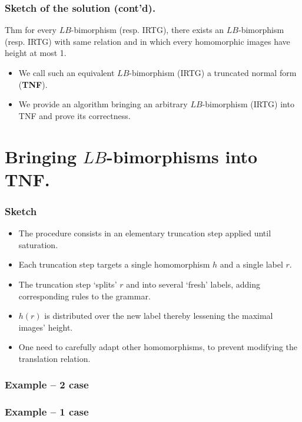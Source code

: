 \documentclass{beamer}
\begin{document}
\begin{frame}
  \frametitle{Sketch of the solution (cont'd).}
  
  \begin{block}{Thm}
    for every $LB$-bimorphism (resp. IRTG), there exists an $LB$-bimorphism (resp. IRTG) with same relation and in which every homomorphic images have height at most 1. 
  \end{block}

  \begin{itemize}
  \item We call such an equivalent $LB$-bimorphism (IRTG) a truncated normal form (\textbf{TNF}).
  \item We provide an algorithm bringing an arbitrary $LB$-bimorphism (IRTG) into TNF and prove its correctness.
  \end{itemize}
 
  
\end{frame}

\section{Bringing $LB$-bimorphisms into TNF.}

\begin{frame}
  \frametitle{Sketch}

  \begin{itemize}
  \item The procedure consists in an elementary truncation step applied until saturation.
  \item Each truncation step targets a single homomorphism $h$ and a single label $r$.
  \item The truncation step `splits' $r$ and into several `fresh' labels, adding corresponding rules to the grammar.
  \item $h(r)$ is distributed over the new label thereby lessening the maximal images' height.
  \item One need to carefully adapt other homomorphisms, to prevent modifying the translation relation.
  \end{itemize}
\end{frame}

\begin{frame}
  \frametitle{Example -- 2 case}
\end{frame}

\begin{frame}
  \frametitle{Example -- 1 case}
\end{frame}
\end{document}
